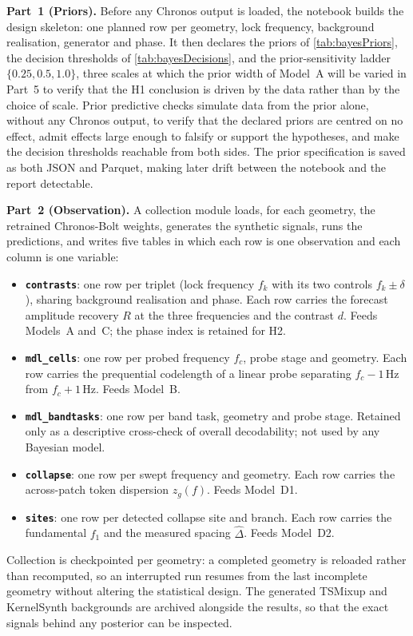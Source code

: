 \medskip
\textbf{Part~1 (Priors).} Before any Chronos output is loaded, the notebook builds the design skeleton: one planned row per geometry, lock frequency, background realisation, generator and phase. It then declares the priors of \autoref{tab:bayesPriors}, the decision thresholds of \autoref{tab:bayesDecisions}, and the prior-sensitivity ladder $\{0.25,0.5,1.0\}$, three scales at which the prior width of Model~A will be varied in Part~5 to verify that the H1 conclusion is driven by the data rather than by the choice of scale. Prior predictive checks simulate data from the prior alone, without any Chronos output, to verify that the declared priors are centred on no effect, admit effects large enough to falsify or support the hypotheses, and make the decision thresholds reachable from both sides. The prior specification is saved as both JSON and Parquet, making later drift between the notebook and the report detectable.

\medskip
\textbf{Part~2 (Observation).} A collection module loads, for each geometry, the retrained Chronos-Bolt weights, generates the synthetic signals, runs the predictions, and writes five tables in which each row is one observation and each column is one variable:
\begin{itemize}\setlength{\itemsep}{2pt}
    \item \textbf{\texttt{contrasts}}: one row per triplet (lock frequency $f_k$ with its two controls $f_k \pm \delta$), sharing background realisation and phase. Each row carries the forecast amplitude recovery $R$ at the three frequencies and the contrast $d$. Feeds Models~A and~C; the phase index is retained for H2.
    \item \textbf{\texttt{mdl\_cells}}: one row per probed frequency $f_c$, probe stage and geometry. Each row carries the prequential codelength of a linear probe separating $f_c - 1$\,Hz from $f_c + 1$\,Hz. Feeds Model~B.
    \item \textbf{\texttt{mdl\_bandtasks}}: one row per band task, geometry and probe stage. Retained only as a descriptive cross-check of overall decodability; not used by any Bayesian model.
    \item \textbf{\texttt{collapse}}: one row per swept frequency and geometry. Each row carries the across-patch token dispersion $z_g(f)$. Feeds Model~D1.
    \item \textbf{\texttt{sites}}: one row per detected collapse site and branch. Each row carries the fundamental $f_1$ and the measured spacing $\hat\Delta$. Feeds Model~D2.
\end{itemize}
Collection is checkpointed per geometry: a completed geometry is reloaded rather than recomputed, so an interrupted run resumes from the last incomplete geometry without altering the statistical design. The generated TSMixup and KernelSynth backgrounds are archived alongside the results, so that the exact signals behind any posterior can be inspected.

